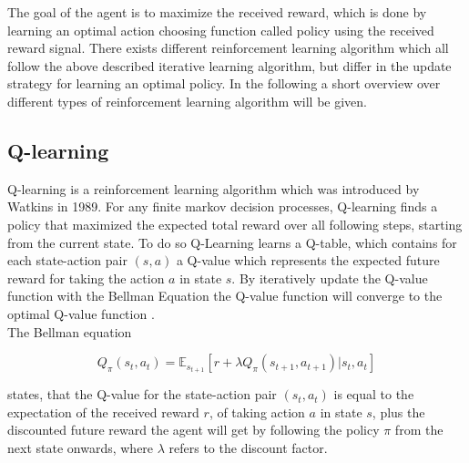 
The goal of the agent is to maximize the received reward, which is done by learning an optimal action choosing function called policy using the received reward signal.
There exists different reinforcement learning algorithm which all follow the above described iterative learning algorithm, but differ in the update strategy for learning an optimal policy. In the following a short overview over different types of reinforcement learning algorithm will be  given.\\

\subsection{Q-learning}

Q-learning is a reinforcement learning algorithm which was introduced by Watkins \cite{QLearning} in 1989. 
For any finite markov decision processes, Q-learning finds a policy that maximized the expected total reward over all following steps, starting from the current state.
To do so Q-Learning learns a Q-table, which contains for each state-action pair $(s, a)$ a Q-value which represents the expected future reward for taking the action $a$ in state $s$. 
By iteratively update the Q-value function with the Bellman Equation the Q-value function will converge to the optimal Q-value function \cite{QLearningProof}.\\

The Bellman equation 


\begin{equation} \label{eq:bellman_eq1}
Q_{\pi} (s_t, a_t) =\mathbb{E}_{s_{t+1}} [r + \lambda Q_\pi(s_{t+1}, a_{t+1}) | s_t, a_t]
\end{equation}

states, that the Q-value for the state-action pair $(s_t, a_t)$ is equal to the expectation of the received reward $r$, of taking action $a$ in state $s$, plus the discounted future reward the agent will get by following the policy $\pi$ from the next state onwards, where $\lambda$ refers to the discount factor.\\

